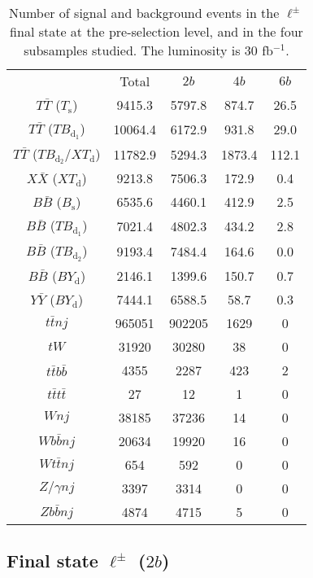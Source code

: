 \documentclass[12pt,a4paper]{article}
\newcommand{\TT}{T \bar T}
\newcommand{\BB}{B \bar B}
\newcommand{\XX}{X \bar X}
\newcommand{\YY}{Y \bar Y}
\newcommand{\Ts}{T_\text{s}}
\newcommand{\Bs}{B_\text{s}}
\newcommand{\TBd}{TB_{\text{d}_1}}
\newcommand{\TBD}{TB_{\text{d}_2}}
\newcommand{\XTd}{XT_\text{d}}
\newcommand{\BYd}{BY_\text{d}}
\begin{document}
\begin{table}[htb]
\begin{center}
\begin{tabular}{ccccc}
                      & Total   & $2b$   & $4b$   & $6b$  \\[1mm]
   $\TT$ ($\Ts$)      & 9415.3  & 5797.8 & 874.7  & 26.5 \\
   $\TT$ ($\TBd$)     & 10064.4 & 6172.9 & 931.8  & 29.0 \\
$\TT$ ($\TBD$/$\XTd$) & 11782.9 & 5294.3 & 1873.4 & 112.1 \\
   $\XX$ ($\XTd$)     & 9213.8  & 7506.3 & 172.9  & 0.4   \\
   $\BB$ ($\Bs$)      & 6535.6  & 4460.1 & 412.9  & 2.5 \\
   $\BB$ ($\TBd$)     & 7021.4  & 4802.3 & 434.2  & 2.8 \\
   $\BB$ ($\TBD$)     & 9193.4  & 7484.4 & 164.6  & 0.0 \\
   $\BB$ ($\BYd$)     & 2146.1  & 1399.6 & 150.7  & 0.7 \\
   $\YY$ ($\BYd$)     & 7444.1  & 6588.5 & 58.7   & 0.3 \\
\hline
   $t \bar tnj$       & 965051  & 902205 & 1629   & 0 \\  
   $tW$               & 31920   & 30280  & 38     & 0 \\
   $t\bar tb\bar b$   & 4355    & 2287   & 423    & 2 \\
   $t\bar tt\bar t$   & 27      & 12     & 1      & 0 \\
   $Wnj$              & 38185   & 37236  & 14     & 0 \\
   $W b \bar bnj$     & 20634   & 19920  & 16     & 0 \\
   $W t \bar tnj$     & 654     & 592    & 0      & 0 \\
   $Z/\gamma nj$      & 3397    & 3314   & 0      & 0 \\
   $Z b \bar bnj$     & 4874    & 4715   & 5      & 0 \\
\end{tabular}
\end{center}
\caption{Number of signal and background events in the $\ell^\pm$ final state at the pre-selection level, and in the four subsamples studied. The luminosity is 30 fb$^{-1}$.}
\label{tab:nsnb-1Q1}
\end{table}



\subsection{Final state $\ell^\pm$ ($2b$)}
\end{document}
